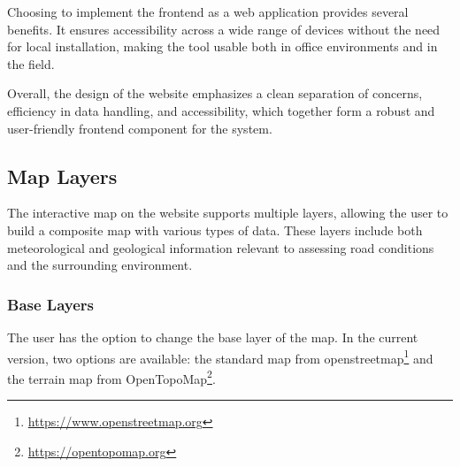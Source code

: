 Choosing to implement the frontend as a web application provides several benefits. It ensures accessibility across a wide range of devices without the need for local installation, making the tool usable both in office environments and in the field.

Overall, the design of the website emphasizes a clean separation of concerns, efficiency in data handling, and accessibility, which together form a robust and user-friendly frontend component for the system.

\subsection{Map Layers}
The interactive map on the website supports multiple layers, allowing the user to build a composite map with various types of data. These layers include both meteorological and geological information relevant to assessing road conditions and the surrounding environment.

\subsubsection*{Base Layers}
The user has the option to change the base layer of the map. In the current version, two options are available: the standard map from \Gls{openstreetmap}\footnote{\url{https://www.openstreetmap.org}} and the terrain map from OpenTopoMap\footnote{\url{https://opentopomap.org}}.

